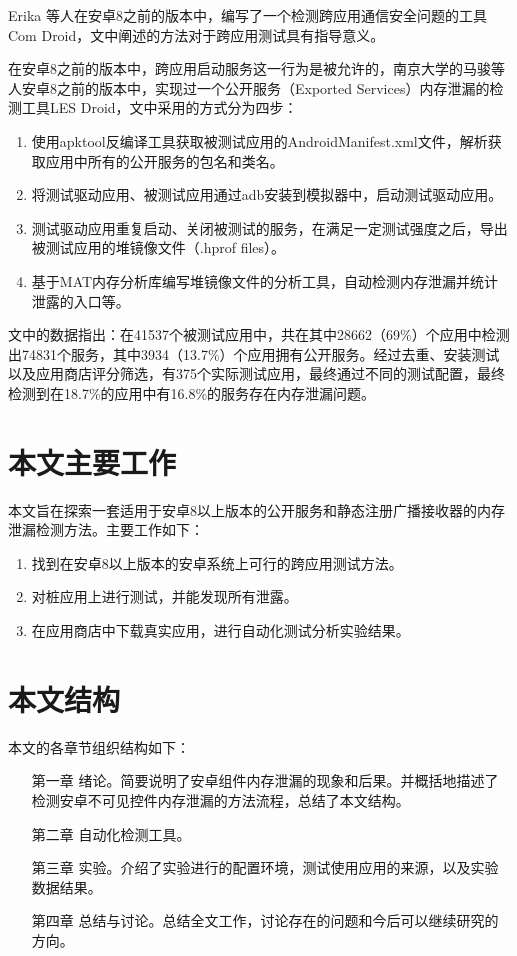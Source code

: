 \documentclass[winfonts]{njuthesis}
\begin{document}
Erika 等人在安卓8之前的版本中，编写了一个检测跨应用通信安全问题的工具Com Droid\cite{chin2011analyzing}，文中阐述的方法对于跨应用测试具有指导意义。


在安卓8之前的版本中，跨应用启动服务这一行为是被允许的，南京大学的马骏等人安卓8之前的版本中，实现过一个公开服务（Exported Services）内存泄漏的检测工具LES Droid\cite{jun2018lesdroid}，文中采用的方式分为四步：

\begin{enumerate}
	\item 使用apktool反编译工具\cite{apktool}获取被测试应用的AndroidManifest.xml文件，解析获取应用中所有的公开服务的包名和类名。
	\item 将测试驱动应用、被测试应用通过adb安装到模拟器中，启动测试驱动应用。
	\item 测试驱动应用重复启动、关闭被测试的服务，在满足一定测试强度之后，导出被测试应用的堆镜像文件（.hprof files）。
	\item 基于MAT内存分析库\cite{mat}编写堆镜像文件的分析工具，自动检测内存泄漏并统计泄露的入口等。
\end{enumerate}


文中的数据指出：在41537个被测试应用中，共在其中28662（69\%）个应用中检测出74831个服务，其中3934（13.7\%）个应用拥有公开服务。经过去重、安装测试以及应用商店评分筛选，有375个实际测试应用，最终通过不同的测试配置，最终检测到在18.7\%的应用中有16.8\%的服务存在内存泄漏问题。


\section{本文主要工作}
本文旨在探索一套适用于安卓8以上版本的公开服务和静态注册广播接收器的内存泄漏检测方法。主要工作如下：
\begin{enumerate}
\item 找到在安卓8以上版本的安卓系统上可行的跨应用测试方法。

\item 对桩应用上进行测试，并能发现所有泄露。

\item 在应用商店中下载真实应用，进行自动化测试分析实验结果。

\end{enumerate}
\section{本文结构}
本文的各章节组织结构如下：
\begin{itemize}
	\item[第一章] 绪论。简要说明了安卓组件内存泄漏的现象和后果。并概括地描述了检测安卓不可见控件内存泄漏的方法流程，总结了本文结构。
	\item[第二章] 自动化检测工具。
	\item[第三章] 实验。介绍了实验进行的配置环境，测试使用应用的来源，以及实验数据结果。
	\item[第四章] 总结与讨论。总结全文工作，讨论存在的问题和今后可以继续研究的方向。
\end{itemize}
\end{document}
